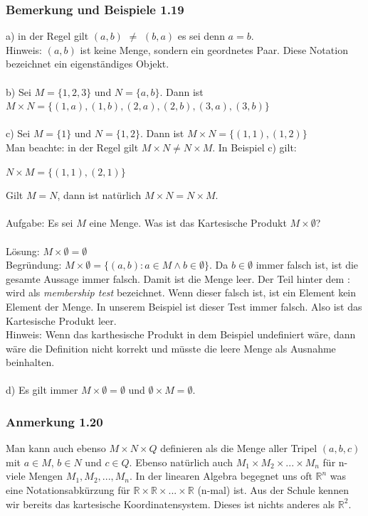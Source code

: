 \documentclass{article}
\begin{document}
\subsubsection*{Bemerkung und Beispiele 1.19}
a) in der Regel gilt $(a, b)$ $\neq$ $(b, a)$ es sei denn $a = b$. \\
Hinweis: $(a, b)$ ist keine Menge, sondern ein geordnetes Paar. Diese Notation bezeichnet ein eigenständiges Objekt. \\
\\
b) Sei $M = \{1, 2, 3\}$ und $N = \{a, b\}$. Dann ist $M \times N = \{(1, a), (1, b), (2, a), (2, b), (3, a), (3, b)\}$ \\
\\
c) Sei $M = \{1\}$ und $N = \{1, 2\}$. Dann ist $M \times N = \{(1, 1), (1, 2)\}$ \\
Man beachte: in der Regel gilt $M \times N \neq N \times M$. In Beispiel c) gilt: 
\begin{center}
    $N \times M = \{(1, 1), (2, 1)\}$
\end{center}
Gilt $M = N$, dann ist natürlich $M \times N = N \times M$. \\
\\
Aufgabe: Es sei $M$ eine Menge. Was ist das Kartesische Produkt $M \times \emptyset$? \\
\\
Lösung: $M \times \emptyset = \emptyset$ \\
Begründung: $M \times \emptyset = \{(a, b): a \in M \wedge b \in \emptyset\}$. Da $b \in \emptyset$ immer falsch ist, ist die gesamte Aussage immer falsch. Damit ist die Menge leer. 
Der Teil hinter dem : wird als \textit{membership test} bezeichnet. Wenn dieser falsch ist, ist ein Element kein Element der Menge. In unserem Beispiel ist dieser Test immer falsch. Also ist das Kartesische Produkt leer. \\
Hinweis: Wenn das karthesische Produkt in dem Beispiel undefiniert wäre, dann wäre die Definition nicht korrekt und müsste die leere Menge als Ausnahme beinhalten. \\
\\
d) Es gilt immer $M \times \emptyset = \emptyset$ und $\emptyset \times M = \emptyset$. \\

\subsubsection*{Anmerkung 1.20}
Man kann auch ebenso $M \times N \times Q$ definieren als die Menge aller Tripel $(a, b, c)$ mit $a \in M$, $b \in N$ und $c \in Q$. 
Ebenso natürlich auch $M_1 \times M_2 \times ... \times M_n$ für n-viele Mengen $M_1, M_2, ..., M_n$.
In der linearen Algebra begegnet uns oft $\mathbb{R}^n$ was eine Notationsabkürzung für $\mathbb{R} \times \mathbb{R} \times ... \times \mathbb{R}$ (n-mal) ist.
Aus der Schule kennen wir bereits das kartesische Koordinatensystem. Dieses ist nichts anderes als $\mathbb{R}^2$.
\end{document}
